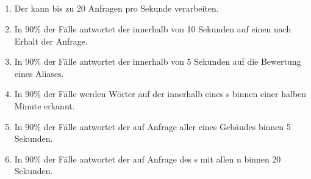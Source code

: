 \subsection{%
}

\begin{enumerate}
    \item Der %
        kann %
        bis zu 20 Anfragen pro Sekunde verarbeiten.
    \item In 90\% der Fälle antwortet der %
        innerhalb von 10 Sekunden auf einen %
        nach Erhalt der Anfrage.
    \item In 90\% der Fälle antwortet der %
        innerhalb von 5 Sekunden auf die Bewertung eines Aliases.
    \item In 90\% der Fälle werden Wörter auf der %
        innerhalb eines %
        s binnen einer halben Minute erkannt.
    \item In 90\% der Fälle antwortet der %
        auf Anfrage aller %
        eines Gebäudes binnen 5 Sekunden.
    \item In 90\% der Fälle antwortet der %
        auf Anfrage des %
        s mit allen %
        n binnen 20 Sekunden.
\end{enumerate}